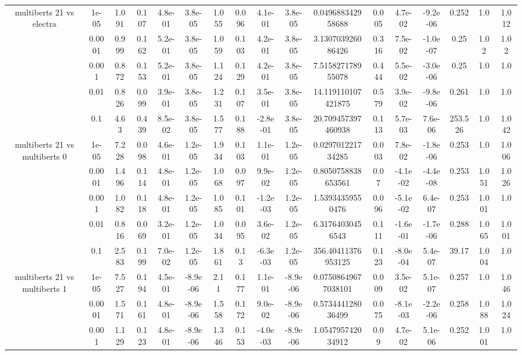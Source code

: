 \begin{tabular}{|c|c|c|c|c|c|c|c|c|c|c|c|c|c|c|c|c|}
\hline
\multirow{5}{*}{multiberts 21 vs electra } & 1e-05 & 1.091 & 0.107 & 4.8e-01 & 3.8e-05 & 1.055 & 0.096 & 4.1e-01 & 3.8e-05 & 0.049688342958688 & 0.005 & 4.7e-02 & -9.2e-06 & 0.252 & 1.0 & 1.012 \\
 & 0.0001 & 0.999 & 0.162 & 5.2e-01 & 3.8e-05 & 1.059 & 0.103 & 4.2e-01 & 3.8e-05 & 3.130703926086426 & 0.316 & 7.5e-02 & -1.0e-07 & 0.25 & 1.02 & 1.02 \\
 & 0.001 & 0.872 & 0.153 & 5.2e-01 & 3.8e-05 & 1.124 & 0.129 & 4.2e-01 & 3.8e-05 & 7.515827178955078 & 0.444 & 5.5e-02 & -3.0e-06 & 0.25 & 1.0 & 1.0 \\
 & 0.01 & 0.826 & 0.099 & 3.9e-01 & 3.8e-05 & 1.231 & 0.107 & 3.5e-01 & 3.8e-05 & 14.119110107421875 & 0.579 & 3.9e-02 & -9.8e-06 & 0.261 & 1.0 & 1.0 \\
 & 0.1 & 4.63 & 0.439 & 8.5e-02 & 3.8e-05 & 1.577 & 0.188 & -2.8e-01 & 3.8e-05 & 20.709457397460938 & 0.113 & 5.7e-03 & 7.6e-06 & 253.526 & 1.0 & 1.042 \\
\hline
\multirow{5}{*}{multiberts 21 vs multiberts 0} & 1e-05 & 7.228 & 0.098 & 4.6e-01 & 1.2e-05 & 1.934 & 0.103 & 1.1e-01 & 1.2e-05 & 0.029701221734285 & 0.003 & 7.8e-02 & -1.8e-06 & 0.253 & 1.0 & 1.006 \\
 & 0.0001 & 1.496 & 0.114 & 4.8e-01 & 1.2e-05 & 1.068 & 0.097 & 9.9e-02 & 1.2e-05 & 0.8050758838653561 & 0.07 & -4.1e-02 & -4.4e-08 & 0.253 & 1.051 & 1.026 \\
 & 0.001 & 1.082 & 0.118 & 4.8e-01 & 1.2e-05 & 1.085 & 0.101 & -1.2e-03 & 1.2e-05 & 1.53934359550476 & 0.096 & -5.1e-02 & 6.4e-07 & 0.253 & 1.001 & 1.0 \\
 & 0.01 & 0.816 & 0.069 & 3.2e-01 & 1.2e-05 & 1.034 & 0.095 & 3.6e-02 & 1.2e-05 & 6.31764030456543 & 0.111 & -1.6e-01 & -1.7e-06 & 0.288 & 1.065 & 1.001 \\
 & 0.1 & 2.583 & 0.199 & 7.0e-02 & 1.2e-05 & 1.861 & 0.13 & -6.3e-03 & 1.2e-05 & 356.40411376953125 & 0.123 & -8.0e-04 & 5.4e-07 & 39.17 & 1.004 & 1.0 \\
\hline
\multirow{5}{*}{multiberts 21 vs multiberts 1} & 1e-05 & 7.527 & 0.194 & 4.5e-01 & -8.9e-06 & 2.11 & 0.177 & 1.1e-01 & -8.9e-06 & 0.07508649677038101 & 0.009 & 3.5e-02 & 5.1e-07 & 0.257 & 1.0 & 1.046 \\
 & 0.0001 & 1.571 & 0.161 & 4.8e-01 & -8.9e-06 & 1.558 & 0.172 & 9.0e-02 & -8.9e-06 & 0.573444128036499 & 0.075 & -8.1e-03 & -2.2e-06 & 0.258 & 1.088 & 1.024 \\
 & 0.001 & 1.129 & 0.123 & 4.8e-01 & -8.9e-06 & 1.346 & 0.153 & -4.0e-03 & -8.9e-06 & 1.054795742034912 & 0.09 & 4.7e-02 & 5.1e-06 & 0.252 & 1.001 & 1.0 \\

\end{tabular}
